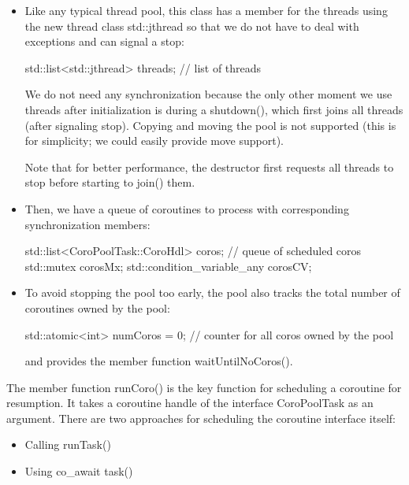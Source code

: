 \begin{itemize}
\item 
Like any typical thread pool, this class has a member for the threads using the new thread class std::jthread so that we do not have to deal with exceptions and can signal a stop:

\begin{cpp}
std::list<std::jthread> threads; // list of threads
\end{cpp}

We do not need any synchronization because the only other moment we use threads after initialization is during a shutdown(), which first joins all threads (after signaling stop). Copying and moving the pool is not supported (this is for simplicity; we could easily provide move support).

Note that for better performance, the destructor first requests all threads to stop before starting to join() them.

\item 
Then, we have a queue of coroutines to process with corresponding synchronization members:

\begin{cpp}
std::list<CoroPoolTask::CoroHdl> coros; // queue of scheduled coros
std::mutex corosMx;
std::condition_variable_any corosCV;
\end{cpp}

\item 
To avoid stopping the pool too early, the pool also tracks the total number of coroutines owned by the pool:

\begin{cpp}
std::atomic<int> numCoros = 0; // counter for all coros owned by the pool
\end{cpp}

and provides the member function waitUntilNoCoros().
\end{itemize}

The member function runCoro() is the key function for scheduling a coroutine for resumption. It takes a coroutine handle of the interface CoroPoolTask as an argument. There are two approaches for scheduling the coroutine interface itself:

\begin{itemize}
\item 
Calling runTask()

\item 
Using co\_await task()
\end{itemize}

